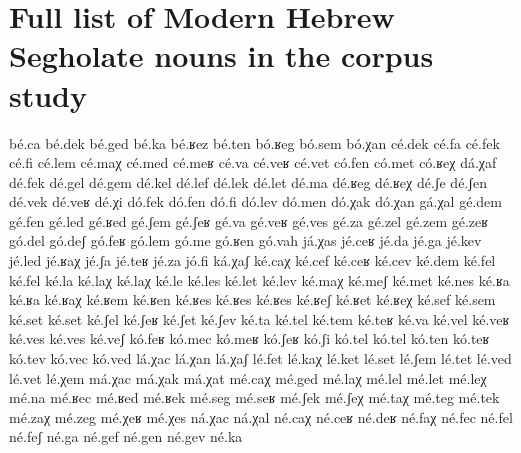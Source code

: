\chapter{Full list of Modern Hebrew Segholate nouns in the corpus study}\label{appendix:b}
\begin{multicols}{4}
\begin{exe}[(999)]
\ex bé.ca
\ex bé.dek
\ex bé.ged
\ex bé.ka
\ex bé.ʁez
\ex bé.ten
\ex bó.ʁeg
\ex bó.sem
\ex bó.χan
\ex cé.dek
\ex cé.fa
\ex cé.fek
\ex cé.fi
\ex cé.lem
\ex cé.maχ
\ex cé.med
\ex cé.meʁ
\ex cé.va
\ex cé.veʁ
\ex cé.vet
\ex có.fen
\ex có.met
\ex có.ʁeχ
\ex dá.χaf
\ex dé.fek
\ex dé.gel
\ex dé.gem
\ex dé.kel
\ex dé.lef
\ex dé.lek
\ex dé.let
\ex dé.ma
\ex dé.ʁeg
\ex dé.ʁeχ
\ex dé.ʃe
\ex dé.ʃen
\ex dé.vek
\ex dé.veʁ
\ex dé.χi
\ex dó.fek
\ex dó.fen
\ex dó.fi
\ex dó.lev
\ex dó.men
\ex dó.χak
\ex dó.χan
\ex gá.χal
\ex gé.dem
\ex gé.fen
\ex gé.led
\ex gé.ʁed
\ex gé.ʃem
\ex gé.ʃeʁ
\ex gé.va
\ex gé.veʁ
\ex gé.ves
\ex gé.za
\ex gé.zel
\ex gé.zem
\ex gé.zeʁ
\ex gó.del
\ex gó.deʃ
\ex gó.feʁ
\ex gó.lem
\ex gó.me
\ex gó.ʁen
\ex gó.vah
\ex já.χas
\ex jé.ceʁ
\ex jé.da
\ex jé.ga
\ex jé.kev
\ex jé.led
\ex jé.ʁaχ
\ex jé.ʃa
\ex jé.teʁ
\ex jé.za
\ex jó.fi
\ex ká.χaʃ
\ex ké.caχ
\ex ké.cef
\ex ké.ceʁ
\ex ké.cev
\ex ké.dem
\ex ké.fel
\ex ké.fel
\ex ké.la
\ex ké.laχ
\ex ké.laχ
\ex ké.le
\ex ké.les
\ex ké.let
\ex ké.lev
\ex ké.maχ
\ex ké.meʃ
\ex ké.met
\ex ké.nes
\ex ké.ʁa
\ex ké.ʁa
\ex ké.ʁaχ
\ex ké.ʁem
\ex ké.ʁen
\ex ké.ʁes
\ex ké.ʁes
\ex ké.ʁes
\ex ké.ʁeʃ
\ex ké.ʁet
\ex ké.ʁeχ
\ex ké.sef
\ex ké.sem
\ex ké.set
\ex ké.set
\ex ké.ʃel
\ex ké.ʃeʁ
\ex ké.ʃet
\ex ké.ʃev
\ex ké.ta
\ex ké.tel
\ex ké.tem
\ex ké.teʁ
\ex ké.va
\ex ké.vel
\ex ké.veʁ
\ex ké.ves
\ex ké.ves
\ex ké.veʃ
\ex kó.feʁ
\ex kó.mec
\ex kó.meʁ
\ex kó.ʃeʁ
\ex kó.ʃi
\ex kó.tel
\ex kó.tel
\ex kó.ten
\ex kó.teʁ
\ex kó.tev
\ex kó.vec
\ex kó.ved
\ex lá.χac
\ex lá.χan
\ex lá.χaʃ
\ex lé.fet
\ex lé.kaχ
\ex lé.ket
\ex lé.set
\ex lé.ʃem
\ex lé.tet
\ex lé.ved
\ex lé.vet
\ex lé.χem
\ex má.χac
\ex má.χak
\ex má.χat
\ex mé.caχ
\ex mé.ged
\ex mé.laχ
\ex mé.lel
\ex mé.let
\ex mé.leχ
\ex mé.na
\ex mé.ʁec
\ex mé.ʁed
\ex mé.ʁek
\ex mé.seg
\ex mé.seʁ
\ex mé.ʃek
\ex mé.ʃeχ
\ex mé.taχ
\ex mé.teg
\ex mé.tek
\ex mé.zaχ
\ex mé.zeg
\ex mé.χeʁ
\ex mé.χes
\ex ná.χac
\ex ná.χal
\ex né.caχ
\ex né.ceʁ
\ex né.deʁ
\ex né.faχ
\ex né.fec
\ex né.fel
\ex né.feʃ
\ex né.ga
\ex né.gef
\ex né.gen
\ex né.gev
\ex né.ka

\end{exe}
\end{multicols}
